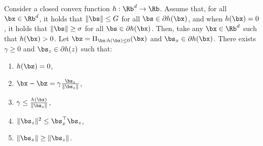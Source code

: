 \begin{lemma}
    \label{lem:proj}
    Consider a closed convex function $h: \Rb^d \rightarrow \Rb$.
    Assume that, for all $\bx \in \Rb^d$, it holds that $\| \bs \| \leq G$ for all $\bs \in \partial h(\bx)$, and when $h(\bx) = 0$, it holds that $\| \bs \| \geq \sigma$ for all $\bs \in \partial h(\bx)$.
    Then, take any $\bx \in \Rb^d$ such that $h(\bx) > 0$.
    Let $\bz = \Pi_{\bx : h(\bx) \leq 0} (\bx)$ and $\bs_x \in \partial h(\bx)$.
    There exists $\gamma \geq 0$ and $\bs_z \in \partial h(z)$ such that:
    \begin{enumerate}
        \item $h (\bz) = 0$,
        \item $\bx - \bz = \gamma \frac{\bs_z}{\| \bs_z \|}$,
        \item $\gamma \leq \frac{h(\bx)}{\| \bs_z \|}$,
        \item $\| \bs_z \|^2 \leq \bs_x^\top \bs_z$,
        \item $\| \bs_x \| \geq \| \bs_z \|$.
    \end{enumerate}
    \end{lemma}
